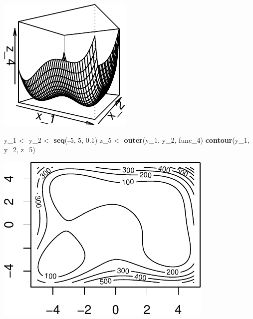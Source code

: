 \documentclass[11pt,]{article}
\newenvironment{Shaded}{\begin{snugshade}}{\end{snugshade}}
\newcommand{\KeywordTok}[1]{\textcolor[rgb]{0.13,0.29,0.53}{\textbf{#1}}}
\newcommand{\DecValTok}[1]{\textcolor[rgb]{0.00,0.00,0.81}{#1}}
\newcommand{\FloatTok}[1]{\textcolor[rgb]{0.00,0.00,0.81}{#1}}
\newcommand{\StringTok}[1]{\textcolor[rgb]{0.31,0.60,0.02}{#1}}
\newcommand{\OperatorTok}[1]{\textcolor[rgb]{0.81,0.36,0.00}{\textbf{#1}}}
\newcommand{\NormalTok}[1]{#1}
\begin{document}
\begin{center}\includegraphics{Optimization_2_files/figure-latex/level_sets-7} \end{center}

\begin{Shaded}
\begin{Highlighting}[]
\NormalTok{y_}\DecValTok{1}\NormalTok{ <-}\StringTok{ }\NormalTok{y_}\DecValTok{2}\NormalTok{ <-}\StringTok{ }\KeywordTok{seq}\NormalTok{(}\OperatorTok{-}\DecValTok{5}\NormalTok{, }\DecValTok{5}\NormalTok{, }\FloatTok{0.1}\NormalTok{)}
\NormalTok{z_}\DecValTok{5}\NormalTok{ <-}\StringTok{ }\KeywordTok{outer}\NormalTok{(y_}\DecValTok{1}\NormalTok{, y_}\DecValTok{2}\NormalTok{, func_}\DecValTok{4}\NormalTok{)}
\KeywordTok{contour}\NormalTok{(y_}\DecValTok{1}\NormalTok{, y_}\DecValTok{2}\NormalTok{, z_}\DecValTok{5}\NormalTok{)}
\end{Highlighting}
\end{Shaded}

\begin{center}\includegraphics{Optimization_2_files/figure-latex/level_sets-8} \end{center}
\end{document}
